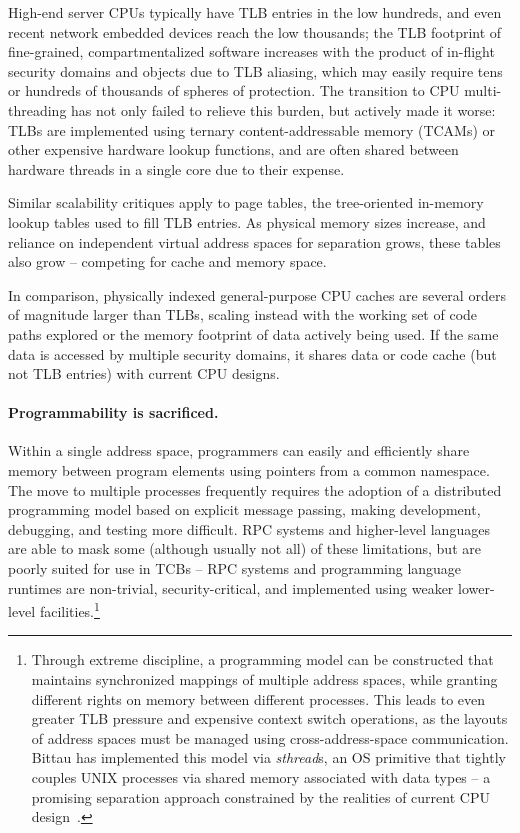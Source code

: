 High-end server CPUs typically have TLB entries in the low hundreds, and
even recent network embedded devices reach 
the low thousands; the TLB
footprint of fine-grained, compartmentalized software increases with the product of
in-flight security domains and objects due to TLB aliasing, which may easily require
tens or hundreds of thousands of spheres of protection.
The transition to CPU multi-threading has not only failed to relieve this burden,
but actively made it worse: TLBs are implemented using ternary content-addressable
memory (TCAMs) or
other expensive hardware lookup functions, and are often shared between hardware
threads in a single core due to their expense.

Similar scalability critiques apply to page tables, the tree-oriented
in-memory lookup tables used to fill TLB entries.
As physical memory sizes increase, and reliance on independent virtual address
spaces for separation grows, these tables also grow -- competing for cache
and memory space.

In comparison, physically indexed general-purpose CPU caches are several orders
of magnitude larger than TLBs, scaling instead with the working set of code paths
explored or the memory footprint of data actively being used.
If the same data is accessed by multiple security domains, it shares data or code
cache (but not TLB entries) with current CPU designs.

\paragraph{Programmability is sacrificed.}
Within a single address space, programmers
can easily and efficiently share memory between program elements using pointers
from a common namespace.
The move to multiple processes frequently requires the adoption of a distributed
programming model based on explicit message passing, making development,
debugging, and testing more difficult.
RPC systems and higher-level languages are able to mask some (although usually
not all) of these limitations, but are poorly suited for use in TCBs -- RPC systems and
programming language
runtimes are non-trivial, security-critical, and implemented using weaker
lower-level facilities.\footnote{Through extreme
discipline, a programming model can be constructed that maintains synchronized
mappings of multiple address spaces, while granting different rights on memory
between different processes.  This leads to even greater TLB pressure
and expensive context switch operations, as
the layouts of address spaces must be managed using cross-address-space
communication.
Bittau has implemented this model via {\em sthread}s, an OS primitive that
tightly couples UNIX processes via shared memory associated with data types
-- a promising separation approach constrained by the realities of current
CPU design~\cite{bittau:wedge}.}

